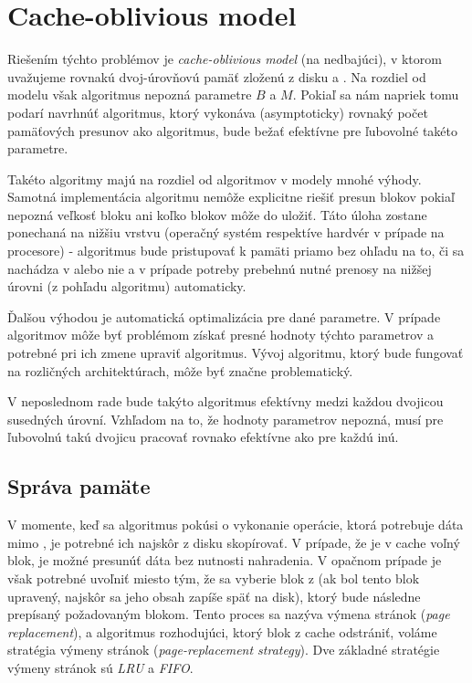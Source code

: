 \section{Cache-oblivious model}
Riešením týchto problémov je \emph{cache-oblivious model} (na \cache nedbajúci), v ktorom uvažujeme rovnakú dvoj-úrovňovú pamäť zloženú z disku a \cache \citep{frigo1999cache,prokop1999cache}. Na rozdiel od \aware modelu však algoritmus nepozná parametre $B$ a $M$. Pokiaľ sa nám napriek tomu podarí navrhnúť algoritmus, ktorý vykonáva (asymptoticky) rovnaký počet pamäťových presunov ako \aware algoritmus, bude bežať efektívne pre ľubovolné takéto parametre.

Takéto algoritmy majú na rozdiel od \aware algoritmov v \extmem modely mnohé výhody. Samotná implementácia algoritmu nemôže explicitne riešiť presun blokov pokiaľ nepozná veľkosť bloku ani koľko blokov môže do \cache uložiť. Táto úloha zostane ponechaná na nižšiu vrstvu (operačný systém respektíve hardvér v prípade \cache na procesore) - algoritmus bude pristupovať k pamäti priamo bez ohľadu na to, či sa nachádza v \cache alebo nie a v prípade potreby prebehnú nutné prenosy na nižšej úrovni (z pohľadu algoritmu) automaticky.

Ďalšou výhodou je automatická optimalizácia pre dané parametre. V prípade \aware algoritmov môže byť problémom získať presné hodnoty týchto parametrov a potrebné pri ich zmene upraviť algoritmus. Vývoj algoritmu, ktorý bude fungovať na rozličných architektúrach, môže byť značne problematický.

V neposlednom rade bude takýto \obliv algoritmus efektívny medzi každou dvojicou susedných úrovní. Vzhľadom na to, že hodnoty parametrov nepozná, musí pre ľubovolnú takú dvojicu pracovať rovnako efektívne ako pre každú inú.


\subsection{Správa pamäte} \label{sec:memmng}
V momente, keď sa \obliv algoritmus pokúsi o vykonanie operácie, ktorá potrebuje dáta mimo \cache, je potrebné ich najskôr z disku skopírovať. V prípade, že je v cache voľný blok, je možné presunúť dáta bez nutnosti nahradenia. V opačnom prípade je však potrebné uvoľniť miesto tým, že sa vyberie blok z \cache (ak bol tento blok upravený, najskôr sa jeho obsah zapíše späť na disk), ktorý bude následne prepísaný požadovaným blokom. Tento proces sa nazýva výmena stránok ({\em page replacement}), a algoritmus rozhodujúci, ktorý blok z cache odstrániť, voláme stratégia výmeny stránok ({\em page-replacement strategy}). Dve základné stratégie výmeny stránok sú \emph{LRU} a \emph{FIFO}.

